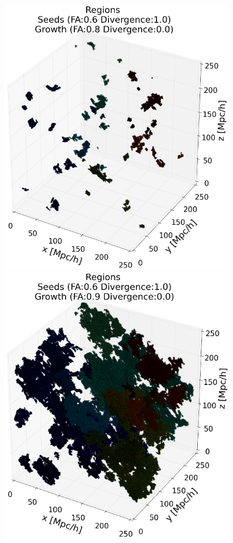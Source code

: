 \documentclass[12pt]{article}
\begin{document}
\begin{figure}[ht]
\begin{minipage}{.45\textwidth}
\end{minipage}
\begin{minipage}{.45\textwidth}
  \centering
  \includegraphics[width=0.9\textwidth]{groups/3d/seeds_FA_6/regions_nonoise_seeds_FA_06_Trace_10_search_FA_08_Trace_00_.png}
\end{minipage}
\begin{minipage}{.45\textwidth}
  \centering
  \includegraphics[width=0.9\textwidth]{groups/3d/seeds_FA_6/regions_nonoise_seeds_FA_06_Trace_10_search_FA_09_Trace_00_.png}

\end{minipage}
\end{figure}
\end{document}
